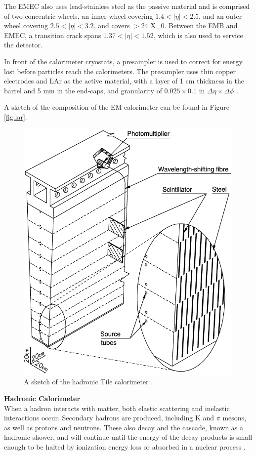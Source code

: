 The \gls{EMEC} also uses lead-stainless steel as the passive material and is comprised of two concentric wheels, an inner wheel covering $1.4 < |\eta| < 2.5$, and an outer wheel covering $2.5 < |\eta| < 3.2$, and covers $>24$ \gls{X_0}. Between the \gls{EMB} and \gls{EMEC}, a transition crack spans $1.37 < |\eta| < 1.52$, which is also used to service the detector.

In front of the calorimeter cryostats, a presampler is used to correct for energy lost before particles reach the calorimeters. The presampler uses thin copper electrodes and \gls{LAr} as the active material, with a layer of 1 cm thickness in the barrel and 5 mm in the end-caps, and granularity of $0.025 \times 0.1$ in $\Delta\eta \times \Delta \phi$ \cite{lar-tdr}.


A sketch of the composition of the \gls{EM} calorimeter can be found in Figure \ref{fig:lar}.

\begin{figure}[!ht]
    \centering
    \includegraphics[width=.65\textwidth]{chapters/chapter2_experiment/images/tile.png}
    \caption{A sketch of the hadronic Tile calorimeter \cite{tile-tdr}.}
    \label{fig:tile}
\end{figure}


\noindent\textbf{Hadronic Calorimeter}\\
\indent When a hadron interacts with matter, both elastic scattering and inelastic interactions occur. Secondary hadrons are produced, including K and $\pi$ mesons, as well as protons and neutrons. These also decay and the cascade, known as a hadronic shower, and will continue until the energy of the decay products is small enough to be halted by ionization energy loss or absorbed in a nuclear process \cite{detectors-for-radiation}.

